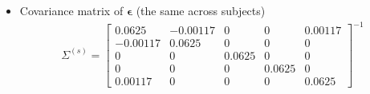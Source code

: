 \documentclass[12pt,titlepage,fleqn]{article}
\newcommand{\1}{{\bm 1}}
\newcommand{\veps}{\boldsymbol \epsilon}
\newcommand{\s}{^{(s)}}
\begin{document}
\begin{itemize}
\item Covariance matrix of $\veps$ (the same across subjects)
\begin{eqnarray*}
\Sigma\s =
\begin{bmatrix}
0.0625 & -0.00117 & 0 & 0 & 0.00117 \\
-0.00117 & 0.0625 & 0 & 0 & 0 \\
0 & 0 & 0.0625 & 0 & 0 \\
0 & 0 & 0 & 0.0625 & 0 \\
0.00117 & 0 & 0 & 0 & 0.0625 
\end{bmatrix}^{-1}
\end{eqnarray*}

\end{itemize}
\end{document}
